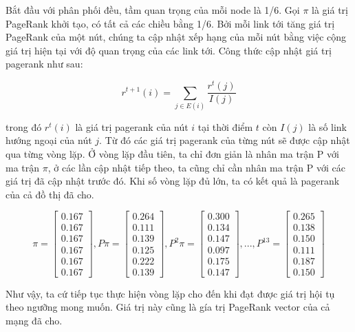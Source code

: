 \documentclass[12pt,a4paper]{article}
\begin{document}
Bắt đầu với phân phối đều, tầm quan trọng của mỗi node là 1/6. Gọi $\pi$ là giá trị PageRank khởi tạo, có tất cả các chiều bằng 1/6. Bởi mỗi link tới tăng giá trị PageRank của một nút, chúng ta cập nhật xếp hạng của mỗi nút bằng việc cộng giá trị hiện tại với độ quan trọng của các link tới. Công thức cập nhật giá trị pagerank như sau:

$$
r^{t+1}(i) = \sum_{j \in E(i)} \dfrac{r^t (j)}{I(j)}
$$

\noindent
trong đó $r^{t}(i)$ là giá trị pagerank của nút $i$ tại thời điểm $t$ còn $I(j)$ là số link hướng ngoại của nút $j$. Từ đó các giá trị pagerank của từng nút sẽ được cập nhật qua từng vòng lặp. Ở vòng lặp đầu tiên, ta chỉ đơn giản là nhân ma trận P với ma trận $\pi$, ở các lần cập nhật tiếp theo, ta cũng chỉ cần nhân ma trận P với các giá trị đã cập nhật trước đó. Khi số vòng lặp đủ lớn, ta có kết quả là pagerank của cả đồ thị đã cho.

$$
\pi = 
\begin{bmatrix}
    0.167 \\
    0.167 \\
    0.167 \\
    0.167 \\
    0.167 \\
    0.167 
\end{bmatrix} , 
P\pi = 
\begin{bmatrix}
	0.264 \\
	0.111 \\
	0.139 \\
	0.125 \\
	0.222 \\
	0.139
\end{bmatrix} ,
P^2\pi =
\begin{bmatrix}
	0.300 \\
	0.134 \\
	0.147 \\
	0.097 \\
	0.175 \\
	0.147
\end{bmatrix} ,..., 
P^{13} = 
\begin{bmatrix}
	0.265 \\
	0.138 \\
	0.150 \\
	0.111 \\
	0.187 \\
	0.150
\end{bmatrix}
$$

\noindent
Như vậy, ta cứ tiếp tục thực hiện vòng lặp cho đến khi đạt được giá trị hội tụ theo ngưỡng mong muốn. Giá trị này cũng là gía trị PageRank vector của cả mạng đã cho.
\end{document}
